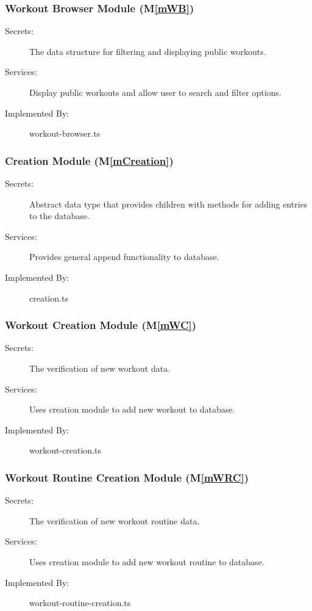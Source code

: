 \documentclass[12pt, titlepage]{article}
\newcommand{\mref}[1]{M\ref{#1}}
\begin{document}
\subsubsection{Workout Browser Module (\mref{mWB})}

\begin{description}
\item[Secrets:] The data structure for filtering and displaying public workouts.
\item[Services:] Display public workouts and allow user to search and filter options.
\item[Implemented By:] workout-browser.ts
\end{description}

\subsubsection{Creation Module (\mref{mCreation})}

\begin{description}
\item[Secrets:] Abstract data type that provides children with methods for adding entries to the database.
\item[Services:] Provides general append functionality to database.
\item[Implemented By:] creation.ts
\end{description}

\subsubsection{Workout Creation Module (\mref{mWC})}

\begin{description}
\item[Secrets:] The verification of new workout data.
\item[Services:] Uses creation module to add new workout to database.
\item[Implemented By:] workout-creation.ts
\end{description}

\subsubsection{Workout Routine Creation Module (\mref{mWRC})}

\begin{description}
\item[Secrets:] The verification of new workout routine data.
\item[Services:] Uses creation module to add new workout routine to database.
\item[Implemented By:] workout-routine-creation.ts
\end{description}
\end{document}
